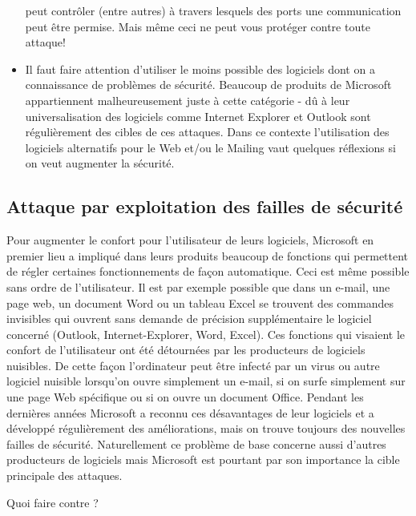 \begin{itemize}
{{} peut contrôler (entre autres) à travers lesquels des ports une communication peut être permise. Mais même ceci ne peut vous protéger contre toute attaque!}
  \item {Il faut faire attention d'utiliser le moins possible des logiciels dont on a connaissance de problèmes de sécurité. Beaucoup de produits de Microsoft appartiennent malheureusement juste à cette catégorie - dû à leur universalisation des logiciels comme Internet Explorer et Outlook sont régulièrement des cibles de ces attaques. Dans ce contexte l'utilisation des logiciels alternatifs pour le Web et/ou le Mailing vaut quelques réflexions si on veut augmenter la sécurité. }
\end{itemize}

\subsection{Attaque par exploitation des failles de sécurité}

Pour augmenter le confort pour l'utilisateur de leurs logiciels, Microsoft en premier lieu a impliqué dans leurs produits beaucoup de fonctions qui permettent de régler certaines fonctionnements de façon automatique. Ceci est même possible sans ordre de l'utilisateur. Il est par exemple possible que dans un e-mail, une page web, un document Word ou un tableau Excel se trouvent des commandes invisibles qui ouvrent sans demande de précision supplémentaire le logiciel concerné (Outlook, Internet-Explorer, Word, Excel). Ces fonctions qui visaient le confort de l'utilisateur ont été détournées par les producteurs de logiciels nuisibles. De cette façon l'ordinateur peut être infecté par un virus ou autre logiciel nuisible lorsqu'on ouvre simplement un e-mail, si on surfe simplement sur une page Web spécifique ou si on ouvre un document Office. Pendant les dernières années Microsoft a reconnu ces désavantages de leur logiciels et a développé régulièrement des améliorations, mais on trouve toujours des nouvelles failles de sécurité. Naturellement ce problème de base concerne aussi d'autres producteurs de logiciels mais Microsoft est pourtant par son importance la cible principale des attaques.

\medskip

Quoi faire contre ?

